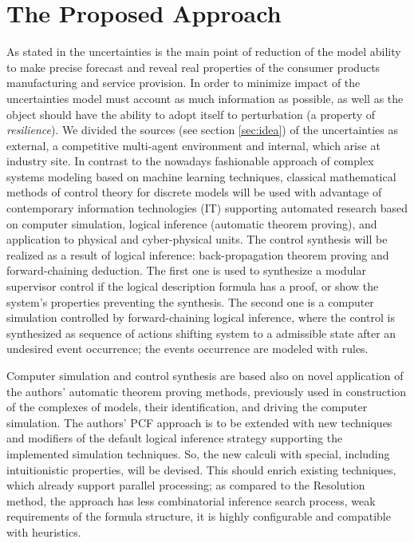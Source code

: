 \documentclass[conference,a4paper]{IEEEtran}
\begin{document}
\section{The Proposed Approach}
\label{sec:methods}


As stated in \cite{b6} the uncertainties is the main point of reduction of the model ability to make precise forecast and reveal real properties of the consumer products manufacturing and service provision. In order to minimize impact of the uncertainties model must account as much information as possible, as well as the object should have the ability to adopt itself to perturbation (a property of \emph{resilience}).  We divided the sources (see section \ref{sec:idea}) of the uncertainties as external, a competitive multi-agent environment and internal, which arise at industry site.  In contrast to the nowadays fashionable approach of complex systems modeling based on machine learning techniques, classical mathematical methods of control theory for discrete models will be used with advantage of contemporary information technologies (IT) supporting automated research based on computer simulation, logical inference (automatic theorem proving), and application to physical and cyber-physical units.  The control synthesis will be realized as a result of logical inference: back-propagation theorem proving and forward-chaining deduction.  The first one is used to synthesize a modular supervisor control if the logical description formula has a proof, or show the system's properties preventing the synthesis.  The second one is a computer simulation controlled by forward-chaining logical inference, where the control is synthesized as sequence of actions shifting system to a admissible state after an undesired event occurrence; the events occurrence are modeled with rules.

Computer simulation and control synthesis are based also on novel application of the authors’ automatic theorem proving methods, previously used in construction of the complexes of models, their identification, and driving the computer simulation. The authors’ PCF approach is to be extended with new techniques and modifiers of the default logical inference strategy supporting the implemented simulation techniques. So, the new calculi with special, including intuitionistic properties, will be devised. This should enrich existing techniques, which already support parallel processing; as compared to the Resolution method, the approach has less combinatorial inference search process, weak requirements of the formula structure, it is highly configurable and compatible with heuristics.
\end{document}
